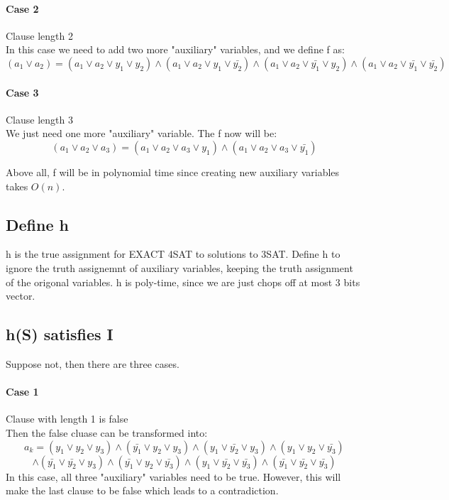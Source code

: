 \documentclass{article}
\begin{document}
\paragraph*{Case 2} Clause length 2\\
In this case we need to add two more "auxiliary" variables, and we define f as:
$$(a_1 \vee a_2) = (a_1 \vee a_2 \vee y_1 \vee y_2) \wedge (a_1 \vee a_2 \vee y_1 \vee \bar{y_2}) \wedge (a_1 \vee a_2 \vee \bar{y_1} \vee y_2) \wedge (a_1 \vee a_2 \vee \bar{y_1} \vee \bar{y_2})$$

\paragraph*{Case 3} Clause length 3\\
We just need one more "auxiliary" variable. The f now will be:
$$(a_1 \vee a_2 \vee a_3) = (a_1 \vee a_2 \vee a_3 \vee y_1) \wedge (a_1 \vee a_2 \vee a_3 \vee \bar{y_1})$$


Above all, f will be in polynomial time since creating new auxiliary variables takes $O(n)$.

\subsection*{Define h}
h is the true assignment for EXACT 4SAT to solutions to 3SAT. Define h to ignore the truth assignemnt 
of auxiliary variables, keeping the truth assignment of the origonal variables. h is poly-time,
since we are just chops off at most 3 bits vector.


\subsection*{h(S) satisfies I}
Suppose not, then there are three cases.
\paragraph*{Case 1} Clause with length 1 is false \\
Then the false cluase can be transformed into:
$$a_k = (y_1 \vee y_2 \vee y_3) \wedge (\bar{y_1} \vee y_2 \vee y_3) \wedge (y_1 \vee \bar{y_2} \vee y_3) \wedge (y_1 \vee y_2 \vee \bar{y_3})$$
$$\wedge (\bar{y_1} \vee \bar{y_2} \vee y_3) \wedge (\bar{y_1} \vee y_2 \vee \bar{y_3}) \wedge (y_1 \vee \bar{y_2} \vee \bar{y_3}) \wedge (\bar{y_1} \vee \bar{y_2} \vee \bar{y_3}) $$
In this case, all three "auxiliary" variables need to be true. However, this will make the last clause to be false which leads to a contradiction.
\end{document}
